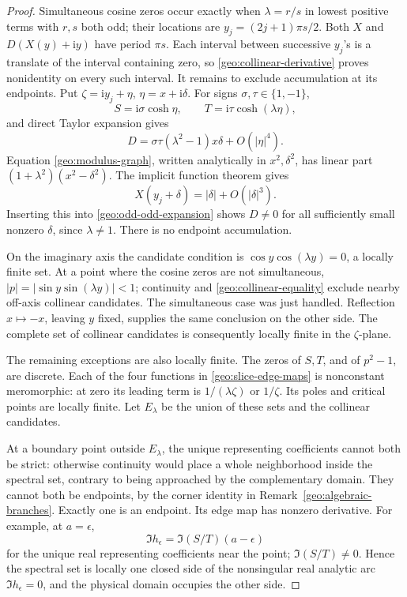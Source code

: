 \documentclass[11pt]{article}
\numberwithin{equation}{section}
\theoremstyle{definition}
\newcommand{\ii}{\mathrm i}
\begin{document}
\begin{proof}
Simultaneous cosine zeros occur exactly when
\(\lambda=r/s\) in lowest positive terms with \(r,s\)
both odd; their locations are
\(y_j=(2j+1)\pi s/2\).
Both \(X\) and \(D(X(y)+\ii y)\) have period \(\pi s\).
Each interval between successive \(y_j\)'s is a
translate of the interval containing zero, so
\eqref{geo:collinear-derivative} proves nonidentity
on every such interval.  It remains to exclude
accumulation at its endpoints.  Put
\(\zeta=\ii y_j+\eta\), \(\eta=x+\ii\delta\).
For signs \(\sigma,\tau\in\{1,-1\}\),
\[
 S=\ii\sigma\cosh\eta,\qquad
 T=\ii\tau\cosh(\lambda\eta),
\]
and direct Taylor expansion gives
\begin{equation}\label{geo:odd-odd-expansion}
 D=\sigma\tau(\lambda^2-1)x\delta+O(|\eta|^4).
\end{equation}
Equation \eqref{geo:modulus-graph}, written analytically
in \(x^2,\delta^2\), has linear part
\((1+\lambda^2)(x^2-\delta^2)\).
The implicit function theorem gives
\[
                  X(y_j+\delta)=|\delta|+O(|\delta|^3).
\]
Inserting this into \eqref{geo:odd-odd-expansion}
shows \(D\ne0\) for all sufficiently small
nonzero \(\delta\), since \(\lambda\ne1\).
There is no endpoint accumulation.

On the imaginary axis the candidate condition is
\(\cos y\cos(\lambda y)=0\), a locally finite set.
At a point where the cosine zeros are not simultaneous,
\(|p|=|\sin y\sin(\lambda y)|<1\); continuity and
\eqref{geo:collinear-equality} exclude nearby off-axis
collinear candidates.  The simultaneous case was just
handled.  Reflection \(x\mapsto-x\), leaving \(y\)
fixed, supplies the same conclusion on the other side.
The complete set of collinear candidates is consequently
locally finite in the \(\zeta\)-plane.

The remaining exceptions are also locally finite.
The zeros of \(S,T\), and of \(p^2-1\), are discrete.
Each of the four functions in \eqref{geo:slice-edge-maps}
is nonconstant meromorphic: at zero its leading term
is \(1/(\lambda\zeta)\) or \(1/\zeta\).
Its poles and critical points are locally finite.
Let \(E_\lambda\) be the union of these sets and the
collinear candidates.

At a boundary point outside \(E_\lambda\), the unique
representing coefficients cannot both be strict:
otherwise continuity would place a whole neighborhood
inside the spectral set, contrary to being approached
by the complementary domain.  They cannot both be
endpoints, by the corner identity in
Remark~\ref{geo:algebraic-branches}.  Exactly one is
an endpoint.  Its edge map has nonzero derivative.
For example, at \(a=\epsilon\),
\[
 \Im h_\epsilon
          =\Im(S/T)(a-\epsilon)
\]
for the unique real representing coefficients near
the point; \(\Im(S/T)\ne0\).  Hence the spectral set
is locally one closed side of the nonsingular
real analytic arc \(\Im h_\epsilon=0\), and the
physical domain occupies the other side.


\end{proof}
\end{document}
